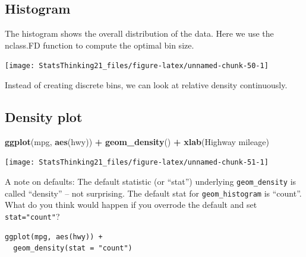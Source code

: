 \documentclass[
  12pt,
]{book}
\newenvironment{Shaded}{\begin{snugshade}}{\end{snugshade}}
\newcommand{\AttributeTok}[1]{\textcolor[rgb]{0.13,0.29,0.53}{#1}}
\newcommand{\FunctionTok}[1]{\textcolor[rgb]{0.13,0.29,0.53}{\textbf{#1}}}
\newcommand{\NormalTok}[1]{#1}
\newcommand{\SpecialCharTok}[1]{\textcolor[rgb]{0.81,0.36,0.00}{\textbf{#1}}}
\newcommand{\StringTok}[1]{\textcolor[rgb]{0.31,0.60,0.02}{#1}}
\begin{document}
\hypertarget{histogram}{%
\subsection{Histogram}\label{histogram}}

The histogram shows the overall distribution of the data. Here we use the nclass.FD function to compute the optimal bin size.

\begin{Shaded}
\end{Shaded}

\texttt{[image: StatsThinking21\_files/figure-latex/unnamed-chunk-50-1]}

Instead of creating discrete bins, we can look at relative density continuously.

\hypertarget{density-plot}{%
\subsection{Density plot}\label{density-plot}}

\begin{Shaded}
\begin{Highlighting}[]
\FunctionTok{ggplot}\NormalTok{(mpg, }\FunctionTok{aes}\NormalTok{(hwy)) }\SpecialCharTok{+}
  \FunctionTok{geom\_density}\NormalTok{() }\SpecialCharTok{+}
  \FunctionTok{xlab}\NormalTok{(}\StringTok{\textquotesingle{}Highway mileage\textquotesingle{}}\NormalTok{) }
\end{Highlighting}
\end{Shaded}

\texttt{[image: StatsThinking21\_files/figure-latex/unnamed-chunk-51-1]}

A note on defaults: The default statistic (or ``stat'') underlying \texttt{geom\_density} is called ``density'' -- not surprising. The default stat for \texttt{geom\_histogram} is ``count''. What do you think would happen if you overrode the default and set \texttt{stat="count"}?

\begin{verbatim}
ggplot(mpg, aes(hwy)) +
  geom_density(stat = "count")
\end{verbatim}
\end{document}
